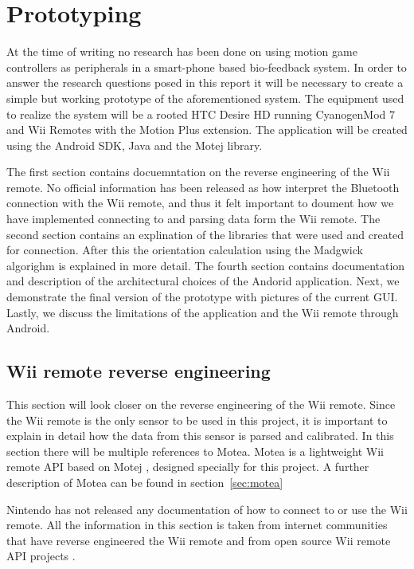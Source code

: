 \chapter{Prototyping}
At the time of writing no research has been done on using motion game controllers as peripherals in a smart-phone based bio-feedback system. In order to answer the research questions posed in this report it will be necessary to create a simple but working prototype of the aforementioned system. The equipment used to realize the system will be a rooted HTC Desire HD \cite{desireHdSpecs} running CyanogenMod 7 and Wii Remotes with the Motion Plus extension. The application will be created using the Android SDK, Java and the Motej library.

The first section contains docuemntation on the reverse engineering of the Wii remote. No official information has been released as how interpret the Bluetooth connection with the Wii remote, and thus it felt important to doument how we have implemented connecting to and parsing data form the Wii remote. The second section contains an explination of the libraries that were used and created for connection. After this the orientation calculation using the Madgwick algorighm is explained in more detail. The fourth section contains documentation and description of the architectural choices of the Andorid application. Next, we demonstrate the final version of the prototype with pictures of the current GUI. Lastly, we discuss the limitations of the application and the Wii remote through Android. 

\section{Wii remote reverse engineering}
This section will look closer on the reverse engineering of the Wii remote. Since the Wii remote is the only sensor to be used in this project, it is important to explain in detail how the data from this sensor is parsed and calibrated. In this section there will be multiple references to Motea. Motea is a lightweight Wii remote API based on Motej \cite{Motej}, designed specially for this project. A further description of Motea can be found in section~\ref{sec:motea}

Nintendo has not released any documentation of how to connect to or use the Wii remote. All the information in this section is taken from internet communities \cite{wiiBrew} that have reverse engineered the Wii remote and from open source Wii remote API projects \cite{wiiMoteLib, Motej}.

